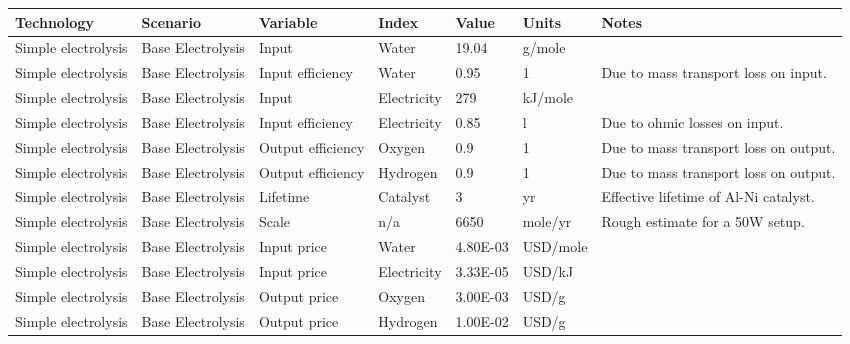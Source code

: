 \documentclass[letterpaper,10pt,english]{sphinxmanual}
\begin{document}
\begin{savenotes}\sphinxattablestart
\centering
{}
\sphinxthecaptionisattop
{}\label{\detokenize{example-technology:table-1}}\label{\detokenize{example-technology:tbl-electrolysisdesigns}}
\sphinxaftertopcaption
\begin{tabulary}{\linewidth}[t]{|T|T|T|T|T|T|T|}
\hline
\sphinxstyletheadfamily 
Technology
&\sphinxstyletheadfamily 
Scenario
&\sphinxstyletheadfamily 
Variable
&\sphinxstyletheadfamily 
Index
&\sphinxstyletheadfamily 
Value
&\sphinxstyletheadfamily 
Units
&\sphinxstyletheadfamily 
Notes
\\
\hline
Simple electrolysis
&
Base Electrolysis
&
Input
&
Water
&
19.04
&
g/mole
&\\
\hline
Simple electrolysis
&
Base Electrolysis
&
Input efficiency
&
Water
&
0.95
&
1
&
Due to mass transport loss on input.
\\
\hline
Simple electrolysis
&
Base Electrolysis
&
Input
&
Electricity
&
279
&
kJ/mole
&\\
\hline
Simple electrolysis
&
Base Electrolysis
&
Input efficiency
&
Electricity
&
0.85
&
l
&
Due to ohmic losses on input.
\\
\hline
Simple electrolysis
&
Base Electrolysis
&
Output efficiency
&
Oxygen
&
0.9
&
1
&
Due to mass transport loss on output.
\\
\hline
Simple electrolysis
&
Base Electrolysis
&
Output efficiency
&
Hydrogen
&
0.9
&
1
&
Due to mass transport loss on output.
\\
\hline
Simple electrolysis
&
Base Electrolysis
&
Lifetime
&
Catalyst
&
3
&
yr
&
Effective lifetime of Al-Ni catalyst.
\\
\hline
Simple electrolysis
&
Base Electrolysis
&
Scale
&
n/a
&
6650
&
mole/yr
&
Rough estimate for a 50W setup.
\\
\hline
Simple electrolysis
&
Base Electrolysis
&
Input price
&
Water
&
4.80E-03
&
USD/mole
&\\
\hline
Simple electrolysis
&
Base Electrolysis
&
Input price
&
Electricity
&
3.33E-05
&
USD/kJ
&\\
\hline
Simple electrolysis
&
Base Electrolysis
&
Output price
&
Oxygen
&
3.00E-03
&
USD/g
&\\
\hline
Simple electrolysis
&
Base Electrolysis
&
Output price
&
Hydrogen
&
1.00E-02
&
USD/g
&\\
\hline
\end{tabulary}
\par
\sphinxattableend\end{savenotes}
\end{document}

